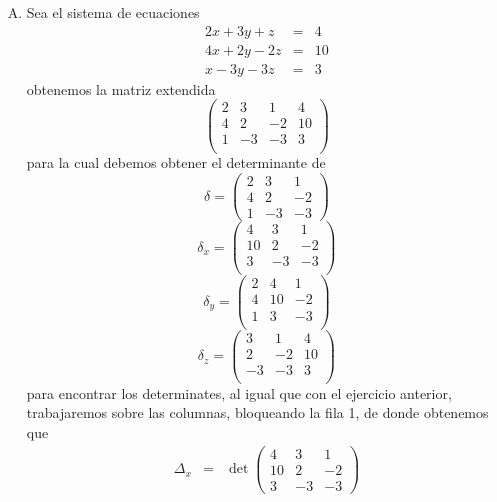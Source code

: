 \documentclass[12pt]{article}
\begin{document}
\begin{multicols}{2}
\begin{enumerate}[A.]
		\hrule\ \\\hrule
		
		\item Sea el sistema de ecuaciones
			\begin{eqnarray*}
				2x + 3y + z&=&  4  \\
				4x+ 2y - 2z&=&  10 \\
				x - 3y - 3z&=&  3
			\end{eqnarray*}
		obtenemos la matriz extendida
			$$\begin{pmatrix}
				2  &  3 &  1 &  4\\
				4  &  2 & -2 & 10\\
				1  & -3 & -3 &  3\\
			\end{pmatrix} $$
		para la cual debemos obtener el determinante de
			$$\delta = \begin{pmatrix}
				2  &  3 &  1 \\
				4  &  2 & -2 \\
				1  & -3 & -3 
			\end{pmatrix} $$
			$$\delta_x = \begin{pmatrix}
				 4  &  3 &  1 \\
				10 &  2 & -2  \\
				 3 & -3 & -3  \\
			\end{pmatrix} $$
			$$\delta_y = \begin{pmatrix}
				2  &  4 &  1  \\
				4  & 10 & -2  \\
				1  &  3 & -3  \\
			\end{pmatrix} $$
			$$\delta_z = \begin{pmatrix}
				 3 &  1 &  4 \\
				 2 & -2 & 10 \\
				-3 & -3 &  3 \\
			\end{pmatrix} $$
		para encontrar los determinates, al igual que con el ejercicio anterior, trabajaremos sobre las columnas, bloqueando la fila 1, de donde obtenemos que
		\begin{eqnarray*}
			\Delta_x &=& \det \left(\begin{array}{rrr}
						4 & 3 & 1 \\
						10 & 2 & -2 \\
						3 & -3 & -3
						\end{array}\right)  \\

\end{eqnarray*}
\end{enumerate}
\end{multicols}
\end{document}
